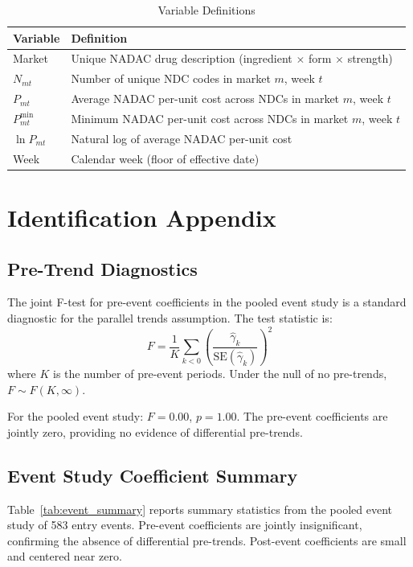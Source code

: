 \documentclass[12pt]{article}
\begin{document}
\begin{table}[H]
\centering
\caption{Variable Definitions}\label{tab:variables}
\begin{threeparttable}
\begin{tabular}{ll}
\toprule
Variable & Definition \\
\midrule
Market & Unique NADAC drug description (ingredient $\times$ form $\times$ strength) \\
$N_{mt}$ & Number of unique NDC codes in market $m$, week $t$ \\
$P_{mt}$ & Average NADAC per-unit cost across NDCs in market $m$, week $t$ \\
$P^{\min}_{mt}$ & Minimum NADAC per-unit cost across NDCs in market $m$, week $t$ \\
$\ln P_{mt}$ & Natural log of average NADAC per-unit cost \\
Week & Calendar week (floor of effective date) \\
\bottomrule
\end{tabular}
\end{threeparttable}
\end{table}


\section{Identification Appendix}\label{app:identification}

\subsection{Pre-Trend Diagnostics}

The joint F-test for pre-event coefficients in the pooled event study is a standard diagnostic for the parallel trends assumption. The test statistic is:
\[
F = \frac{1}{K} \sum_{k < 0} \left(\frac{\hat{\gamma}_k}{\text{SE}(\hat{\gamma}_k)}\right)^2
\]
where $K$ is the number of pre-event periods. Under the null of no pre-trends, $F \sim F(K, \infty)$.

For the pooled event study: $F = 0.00$, $p = 1.00$. The pre-event coefficients are jointly zero, providing no evidence of differential pre-trends.

\subsection{Event Study Coefficient Summary}

Table~\ref{tab:event_summary} reports summary statistics from the pooled event study of 583 entry events. Pre-event coefficients are jointly insignificant, confirming the absence of differential pre-trends. Post-event coefficients are small and centered near zero.
\end{document}
